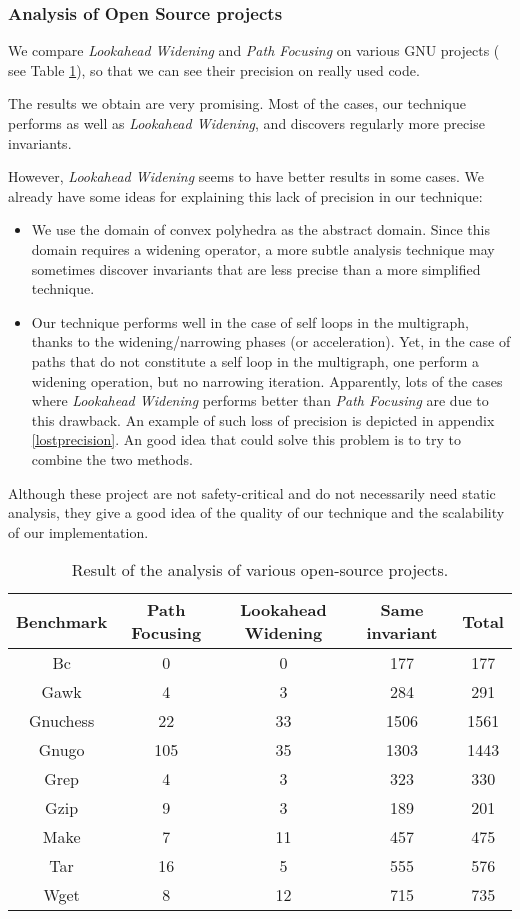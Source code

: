 \documentclass[a4paper,english,titlepage,11pt]{report}
\begin{document}
	\subsubsection{Analysis of Open Source projects}

We compare \emph{Lookahead Widening} and \emph{Path Focusing} on various
GNU projects ( see Table \ref{opensource}), so that we can see their precision
on really used code.

The results we obtain are very promising. Most of the cases, our technique
performs as well as \emph{Lookahead Widening}, and discovers regularly more
precise invariants.

However, \emph{Lookahead Widening} seems to have better results in some cases.
We already have some ideas for explaining this lack of precision in our
technique:

\begin{itemize}
\item We use the domain of convex polyhedra as the abstract domain. Since this
domain requires a widening operator, a more subtle analysis technique may
sometimes discover invariants that are less precise than a more simplified
technique.
\item Our technique performs well in the case of self loops in the multigraph,
thanks to the widening/narrowing phases (or acceleration). Yet, in the case of
paths that do not constitute a self loop in the multigraph, one perform a
widening operation, but no narrowing iteration. Apparently, lots of the cases
where \emph{Lookahead Widening} performs better than \emph{Path Focusing} are
due to this drawback. An example of such loss of precision is depicted in
appendix \ref{lostprecision}.
An good idea that could solve this problem is to try to combine
the two methods.
\end{itemize}

Although these project are not safety-critical and do not necessarily need
static analysis, they give a good idea of the quality of our technique and the
scalability of our implementation.

\begin{table}
\centering
\begin{tabular}{|c||c|c|c|c|} \hline 
Benchmark & Path Focusing & Lookahead Widening & Same invariant & Total \\
\hline \hline
Bc			& 0 & 0 & 177 & 177 \\ \hline
Gawk		& 4 & 3 & 284 & 291 \\ \hline
Gnuchess	& 22 & 33 & 1506 & 1561 \\ \hline
Gnugo		& 105 & 35 & 1303 & 1443 \\ \hline
Grep		& 4 & 3 & 323 & 330 \\ \hline
Gzip		& 9 & 3 & 189 & 201 \\ \hline
Make		&  7 & 11 & 457 & 475 \\ \hline
Tar			& 16 & 5 & 555 & 576 \\ \hline
Wget		& 8 & 12 & 715 & 735 \\ \hline
\end{tabular}
\caption{Result of the analysis of various open-source projects.}
\label{opensource}
\end{table}
\end{document}
